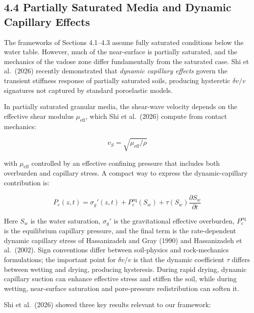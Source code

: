 \documentclass[12pt]{article}
\begin{document}
\subsection{4.4 Partially Saturated Media and Dynamic Capillary
Effects}\label{partially-saturated-media-and-dynamic-capillary-effects}

The frameworks of Sections 4.1--4.3 assume fully saturated conditions
below the water table. However, much of the near-surface is partially
saturated, and the mechanics of the vadose zone differ fundamentally
from the saturated case. Shi et al.~(2026) recently demonstrated that
\emph{dynamic capillary effects} govern the transient stiffness response
of partially saturated soils, producing hysteretic \(\delta v/v\)
signatures not captured by standard poroelastic models.

In partially saturated granular media, the shear-wave velocity depends
on the effective shear modulus \(\mu_{\text{eff}}\), which Shi et
al.~(2026) compute from contact mechanics:

\[v_S = \sqrt{\mu_{\text{eff}} / \rho} \tag{10}\]

with \(\mu_{\text{eff}}\) controlled by an effective confining pressure
that includes both overburden and capillary stress. A compact way to
express the dynamic-capillary contribution is:

\[P_e(z,t) = \sigma_g'(z,t) + P_c^{\mathrm{eq}}(S_w) + \tau(S_w)\frac{\partial S_w}{\partial t} \tag{11}\]

Here \(S_w\) is the water saturation, \(\sigma_g'\) is the gravitational
effective overburden, \(P_c^{\mathrm{eq}}\) is the equilibrium capillary
pressure, and the final term is the rate-dependent dynamic capillary
stress of Hassanizadeh and Gray (1990) and Hassanizadeh et al.~(2002).
Sign conventions differ between soil-physics and rock-mechanics
formulations; the important point for \(\delta v/v\) is that the dynamic
coefficient \(\tau\) differs between wetting and drying, producing
hysteresis. During rapid drying, dynamic capillary suction can enhance
effective stress and stiffen the soil, while during wetting,
near-surface saturation and pore-pressure redistribution can soften it.

Shi et al.~(2026) showed three key results relevant to our framework:
\end{document}

